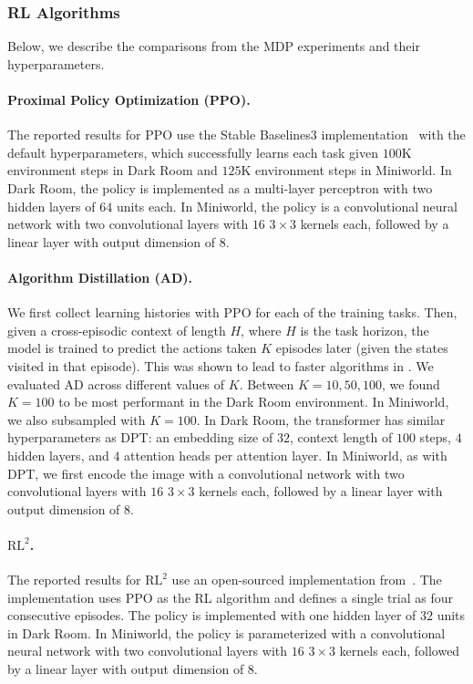 \documentclass{article}
\newcommand{\macroName}{DPT}
\begin{document}
\subsubsection{RL Algorithms}
Below, we describe the comparisons from the MDP experiments and their hyperparameters.
\paragraph{Proximal Policy Optimization (PPO).} The reported results for PPO use the Stable Baselines3 implementation~\citep{raffin2021stable} with the default hyperparameters, which successfully learns each task given $100$K environment steps in Dark Room and $125$K environment steps in Miniworld. In Dark Room, the policy is implemented as a multi-layer perceptron with two hidden layers of $64$ units each. In Miniworld, the policy is a convolutional neural network with two convolutional layers with $16$ $3 \times 3$ kernels each, followed by a linear layer with output dimension of $8$.
\paragraph{Algorithm Distillation (AD).} We first collect learning histories with PPO for each of the training tasks. Then, given a cross-episodic context of length $H$, where $H$ is the task horizon, the model is trained to predict the actions taken $K$ episodes later (given the states visited in that episode). This was shown to lead to faster algorithms in \citep{laskin2022context}. We evaluated AD across different values of $K$. Between $K = 10, 50, 100$, we found $K = 100$ to be most performant in the Dark Room environment. In Miniworld, we also subsampled with $K = 100$. In Dark Room, the transformer has similar hyperparameters as \macroName{}: an embedding size of $32$, context length of $100$ steps, $4$ hidden layers, and $4$ attention heads per attention layer. In Miniworld, as with \macroName{}, we first encode the image with a convolutional network with two convolutional layers with $16$ $3 \times 3$ kernels each, followed by a linear layer with output dimension of $8$.
\paragraph{$\text{RL}^2$.} The reported results for $\text{RL}^2$ use an open-sourced implementation from~\citep{zintgraf2020varibad}. The implementation uses PPO as the RL algorithm and defines a single trial as four consecutive episodes. The policy is implemented with one hidden layer of $32$ units in Dark Room. In Miniworld, the policy is parameterized with a convolutional neural network with two convolutional layers with $16$ $3 \times 3$ kernels each, followed by a linear layer with output dimension of $8$.
\end{document}
